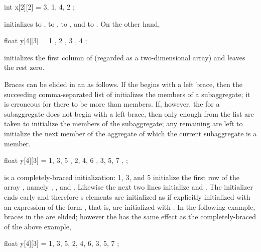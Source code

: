 \begin{codeblock}
int x[2][2] = { 3, 1, 4, 2 };
\end{codeblock}

initializes
to
,
to
,
to
,
and
to
.
On the other hand,

\begin{codeblock}
float y[4][3] = {
  { 1 }, { 2 }, { 3 }, { 4 }
};
\end{codeblock}

initializes the first column of
(regarded as a two-dimensional array)
and leaves the rest zero.
\exitexample

\pnum
Braces can be elided in an
as follows.
If the
begins with a left brace,
then the succeeding comma-separated list of
initializes the members of a subaggregate;
it is erroneous for there to be more
than members.
If, however, the
for a subaggregate does not begin with a left brace,
then only enough
from the list are taken to initialize the members of the subaggregate;
any remaining
are left to initialize the next member of the aggregate
of which the current subaggregate is a member.
\enterexample

\begin{codeblock}
float y[4][3] = {
  { 1, 3, 5 },
  { 2, 4, 6 },
  { 3, 5, 7 },
};
\end{codeblock}

is a completely-braced initialization:
1, 3, and 5 initialize the first row of the array
,
namely
,
,
and
.
Likewise the next two lines initialize
and
.
The initializer ends early and therefore
s
elements are initialized as if explicitly initialized with an
expression of the form
,
that is, are initialized with
.
In the following example, braces in the
are elided;
however the
has the same effect as the completely-braced
of the above example,

\begin{codeblock}
float y[4][3] = {
  1, 3, 5, 2, 4, 6, 3, 5, 7
};
\end{codeblock}

